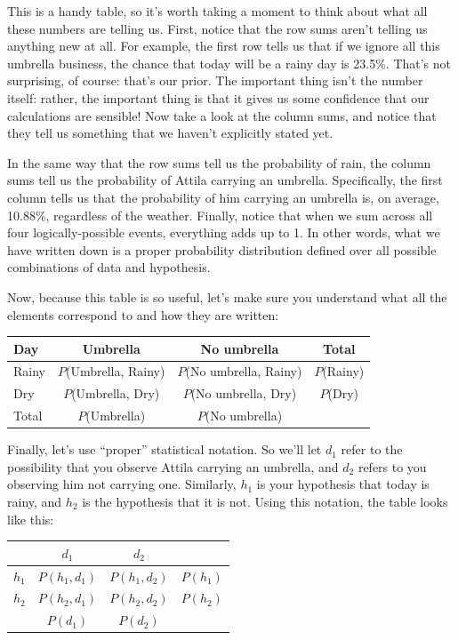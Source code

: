 \documentclass[
  11pt,
  a4paper,
  twoside,symmetric,openright]{book}
\theoremstyle{break}
\theoremstyle{break}
\begin{document}
This is a handy table, so it's worth taking a moment to think about what all these numbers are telling us. First, notice that the row sums aren't telling us anything new at all. For example, the first row tells us that if we ignore all this umbrella business, the chance that today will be a rainy day is 23.5\%. That's not surprising, of course: that's our prior. The important thing isn't the number itself: rather, the important thing is that it gives us some confidence that our calculations are sensible! Now take a look at the column sums, and notice that they tell us something that we haven't explicitly stated yet.

In the same way that the row sums tell us the probability of rain, the column sums tell us the probability of Attila carrying an umbrella. Specifically, the first column tells us that the probability of him carrying an umbrella is, on average, 10.88\%, regardless of the weather. Finally, notice that when we sum across all four logically-possible events, everything adds up to 1. In other words, what we have written down is a proper probability distribution defined over all possible combinations of data and hypothesis.

Now, because this table is so useful, let's make sure you understand what all the elements correspond to and how they are written:

\begin{longtable}[]{@{}lccc@{}}
\toprule\noalign{}
Day & Umbrella & No umbrella & Total \\
\midrule\noalign{}
\endhead
\bottomrule\noalign{}
\endlastfoot
Rainy & \(P\)(Umbrella, Rainy) & \(P\)(No umbrella, Rainy) & \(P\)(Rainy) \\
Dry & \(P\)(Umbrella, Dry) & \(P\)(No umbrella, Dry) & \(P\)(Dry) \\
Total & \(P\)(Umbrella) & \(P\)(No umbrella) & \\
\end{longtable}

Finally, let's use ``proper'' statistical notation. So we'll let \(d_1\) refer to the possibility that you observe Attila carrying an umbrella, and \(d_2\) refers to you observing him not carrying one. Similarly, \(h_1\) is your hypothesis that today is rainy, and \(h_2\) is the hypothesis that it is not. Using this notation, the table looks like this:

\begin{longtable}[]{@{}lccc@{}}
\toprule\noalign{}
& \(d_1\) & \(d_2\) & \\
\midrule\noalign{}
\endhead
\bottomrule\noalign{}
\endlastfoot
\(h_1\) & \(P(h_1, d_1)\) & \(P(h_1, d_2)\) & \(P(h_1)\) \\
\(h_2\) & \(P(h_2, d_1)\) & \(P(h_2, d_2)\) & \(P(h_2)\) \\
& \(P(d_1)\) & \(P(d_2)\) & \\
\end{longtable}
\end{document}
